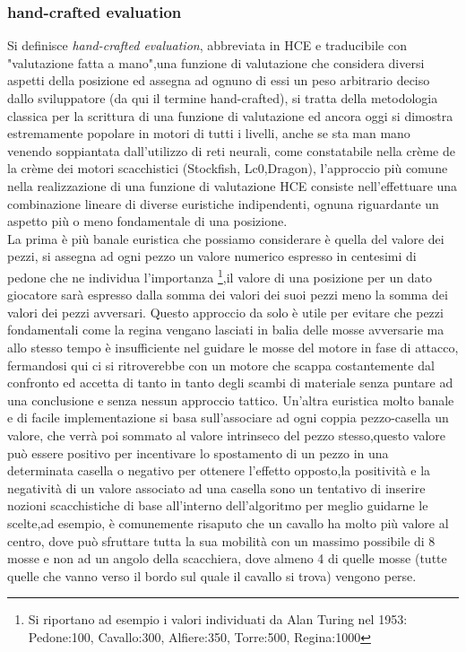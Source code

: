 \subsubsection {hand-crafted evaluation}
Si definisce \emph{hand-crafted evaluation}, abbreviata in HCE e traducibile con "valutazione fatta a mano",una funzione di valutazione che considera diversi aspetti della posizione ed assegna ad ognuno di essi un peso 
arbitrario deciso dallo sviluppatore (da qui il termine hand-crafted), si tratta della metodologia classica per la scrittura di una funzione di valutazione ed ancora oggi si dimostra estremamente popolare in  
motori di tutti i livelli, anche se sta man mano venendo soppiantata dall'utilizzo di reti neurali, come constatabile nella crème de la crème dei motori scacchistici (Stockfish, Lc0,Dragon), l'approccio più comune
nella realizzazione di una funzione di valutazione HCE consiste nell'effettuare una combinazione lineare di diverse euristiche indipendenti, ognuna riguardante un aspetto più o meno fondamentale di una posizione.
\\La prima è più banale euristica che possiamo considerare è quella del valore dei pezzi, si assegna ad ogni pezzo un valore numerico espresso in centesimi di pedone che ne individua l'importanza \footnote{Si riportano ad esempio i valori individuati
da Alan Turing nel 1953: Pedone:100, Cavallo:300, Alfiere:350, Torre:500, Regina:1000},il valore di una posizione per un dato giocatore sarà espresso dalla somma dei valori dei suoi pezzi meno la somma dei valori dei pezzi avversari.
Questo approccio da solo è utile per evitare che  pezzi fondamentali come la regina vengano lasciati in balia delle mosse avversarie ma allo stesso tempo è insufficiente nel guidare le mosse del motore in fase di attacco,
fermandosi qui ci si ritroverebbe con un motore che scappa costantemente dal confronto ed accetta di tanto in tanto degli scambi di materiale senza puntare ad una conclusione e senza nessun approccio tattico.
Un'altra euristica molto banale e di facile implementazione si basa sull'associare ad ogni coppia pezzo-casella un valore, che verrà poi sommato al valore intrinseco del pezzo stesso,questo valore può essere positivo
per incentivare lo spostamento di un pezzo in una determinata casella o negativo per ottenere l'effetto opposto,la positività e la negatività di un valore associato ad una casella sono un tentativo di inserire 
nozioni scacchistiche di base all'interno dell'algoritmo per meglio guidarne le scelte,ad esempio, è comunemente risaputo che un cavallo ha molto più valore al centro, dove può sfruttare tutta la sua mobilità 
con un massimo possibile di 8 mosse e non ad un angolo della scacchiera, dove almeno 4 di quelle mosse  (tutte quelle che vanno verso il bordo sul quale il cavallo si trova) vengono perse.

